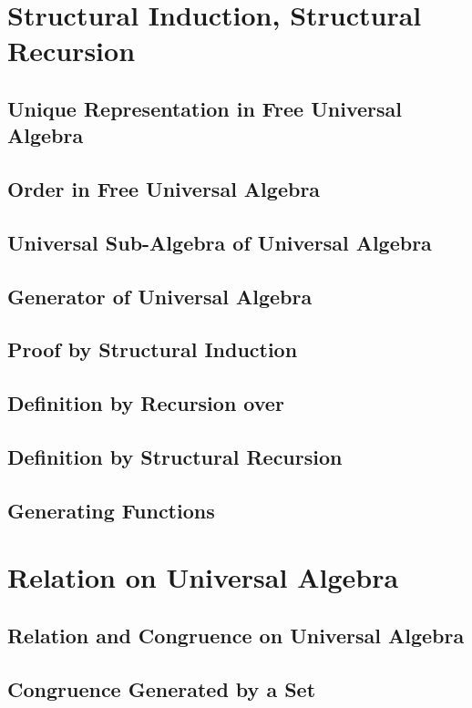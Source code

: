 \section{Structural Induction, Structural Recursion}
    \subsection{Unique Representation in Free Universal Algebra}
      
    \subsection{Order in Free Universal Algebra}
      
    \subsection{Universal Sub-Algebra of Universal Algebra}
      
    \subsection{Generator of Universal Algebra}
      
    \subsection{Proof by Structural Induction}
      
    \subsection{Definition by Recursion over \texorpdfstring{\N}{N}}
      
    \subsection{Definition by Structural Recursion}
      
    \subsection{Generating Functions}
      
\section{Relation on Universal Algebra}
    \subsection{Relation and Congruence on Universal Algebra}
      
    \subsection{Congruence Generated by a Set}
      
